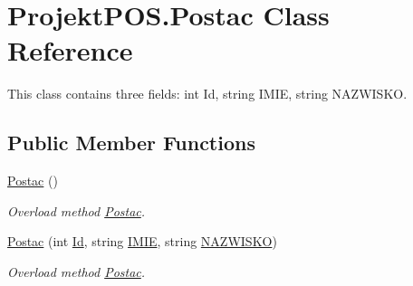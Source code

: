 \hypertarget{class_projekt_p_o_s_1_1_postac}{}\section{Projekt\+P\+O\+S.\+Postac Class Reference}
\label{class_projekt_p_o_s_1_1_postac}


This class contains three fields\+: int Id, string I\+M\+IE, string N\+A\+Z\+W\+I\+S\+KO.  


\subsection*{Public Member Functions}
\begin{DoxyCompactItemize}
\item 
\hyperlink{class_projekt_p_o_s_1_1_postac_a6b6554d7106f9a7eeca65485dede1783}{Postac} ()
\begin{DoxyCompactList}\small\item\em Overload method \hyperlink{class_projekt_p_o_s_1_1_postac}{Postac}. \end{DoxyCompactList}\item 
\hyperlink{class_projekt_p_o_s_1_1_postac_af8ddc319c0df2f4d5b409c36fceaec5c}{Postac} (int \hyperlink{class_projekt_p_o_s_1_1_postac_aaea65193e5fe149a84854074e281b39c}{Id}, string \hyperlink{class_projekt_p_o_s_1_1_postac_adf6ea1a5ed6c787ecffc0dff69385adb}{I\+M\+IE}, string \hyperlink{class_projekt_p_o_s_1_1_postac_acd714441caa5a6cb52b9ae9628b01c3f}{N\+A\+Z\+W\+I\+S\+KO})
\begin{DoxyCompactList}\small\item\em Overload method \hyperlink{class_projekt_p_o_s_1_1_postac}{Postac}. \end{DoxyCompactList}\end{DoxyCompactItemize}

